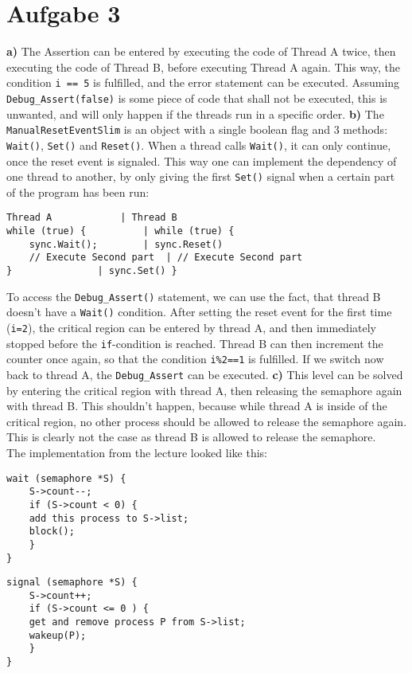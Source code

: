\documentclass{article}
\begin{document}
\section*{Aufgabe 3}
\textbf{a)} The Assertion can be entered by executing the code of Thread A
twice, then executing the code of Thread B, before executing Thread A again.
This way, the condition \texttt{i == 5} is fulfilled, and the error
statement can be executed. Assuming \texttt{Debug\_Assert(false)} is some
piece of code that shall not be executed, this is unwanted, and will only
happen if the threads run in a specific order.
\textbf{b)} The \texttt{ManualResetEventSlim} is an object with a single boolean
flag and 3 methods: \texttt{Wait()}, \texttt{Set()} and \texttt{Reset()}.
When a thread calls \texttt{Wait()}, it can only continue, once the reset event
is signaled. This way one can implement the dependency of one thread to another,
by only giving the first \texttt{Set()} signal when a certain part of the program
has been run:
\begin{lstlisting}
Thread A			| Thread B
while (true) {			| while (true) {
    sync.Wait();		| sync.Reset()
    // Execute Second part	| // Execute Second part
}				| sync.Set() }
\end{lstlisting}
To access the \texttt{Debug\_Assert()} statement, we can use the fact, that thread
B doesn't have a \texttt{Wait()} condition. After setting the reset event for the
first time (\texttt{i=2}), the critical region can be entered by thread A,
and then immediately stopped before the \texttt{if}-condition is reached. Thread
B can then increment the counter once again, so that the condition \texttt{i\%2==1}
is fulfilled. If we switch now back to thread A, the \texttt{Debug\_Assert} can be
executed.
\textbf{c)} This level can be solved by entering the critical region with thread A,
then releasing the semaphore again with thread B. This shouldn't happen, because
while thread A is inside of the critical region, no other process should be allowed
to release the semaphore again. This is clearly not the case as thread B is allowed
to release the semaphore. \\ The implementation from the lecture looked like this:
\begin{minipage}{.49\textwidth}
\begin{lstlisting}
wait (semaphore *S) {
    S->count--;
    if (S->count < 0) {
	add this process to S->list;
	block(); 
    }
}
\end{lstlisting}
\end{minipage}
\begin{minipage}{.49\textwidth}
\begin{lstlisting}
signal (semaphore *S) {
    S->count++;
    if (S->count <= 0 ) {
	get and remove process P from S->list;
	wakeup(P);
    }
}
\end{lstlisting}
\end{minipage}
\end{document}
